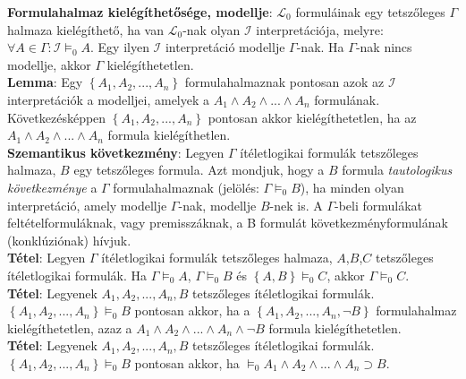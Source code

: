 \documentclass[margin=0px]{article}
\begin{document}
	\noindent \textbf{Formulahalmaz kielégíthetősége, modellje}: $\mathcal{L}_{0}$ formuláinak egy tetszőleges $\Gamma$ halmaza
	kielégíthető, ha van $\mathcal{L}_{0}$-nak olyan $\mathcal{I}$ interpretációja, melyre: $\forall A \in \Gamma: \mathcal{I} \models_{0} A$.
	Egy ilyen $\mathcal{I}$ interpretáció modellje $\Gamma$-nak. Ha $\Gamma$-nak nincs modellje, akkor $\Gamma$ kielégíthetetlen.\\
	
	\noindent \textbf{Lemma}: Egy $\left\{A_{1},A_{2},...,A_{n}\right\}$ formulahalmaznak pontosan azok az $\mathcal{I}$ interpretációk
	a modelljei, amelyek a $A_{1} \wedge A_{2} \wedge ... \wedge A_{n}$ formulának. Következésképpen $\left\{A_{1},A_{2},...,A_{n}\right\}$
	pontosan akkor kielégíthetetlen, ha az $A_{1} \wedge A_{2} \wedge ... \wedge A_{n}$ formula kielégíthetlen.\\
	
	\noindent \textbf{Szemantikus következmény}: Legyen $\Gamma$ ítéletlogikai formulák tetszőleges halmaza, $B$ egy tetszőleges formula.
	Azt mondjuk, hogy a $B$ formula \textit{tautologikus következménye} a $\Gamma$ formulahalmaznak (jelölés: $\Gamma \models_{0} B$), ha minden olyan interpretáció, amely modellje $\Gamma$-nak, modellje $B$-nek is. A $\Gamma$-beli formulákat feltételformuláknak, vagy premisszáknak,
	a B formulát következményformulának (konklúziónak) hívjuk.\\
	
	\noindent \textbf{Tétel}: Legyen $\Gamma$ ítéletlogikai formulák tetszőleges halmaza, $A$,$B$,$C$ tetszőleges ítéletlogikai formulák.
	Ha $\Gamma \models_{0} A$, $\Gamma \models_{0} B$ és $\left\{A,B\right\} \models_{0} C$, akkor $\Gamma \models_{0} C$.\\
	
	\noindent \textbf{Tétel}: Legyenek $A_{1},A_{2},...,A_{n}, B$ tetszőleges ítéletlogikai formulák.
	$\left\{A_{1},A_{2},...,A_{n}\right\} \models_{0} B$ pontosan akkor, ha a $\left\{A_{1},A_{2},...,A_{n}, \neg B\right\}$
	formulahalmaz kielégíthetetlen, azaz a $A_{1} \wedge A_{2} \wedge ... \wedge A_{n} \wedge \neg B$ formula kielégíthetetlen.\\
	
	\noindent \textbf{Tétel}: Legyenek $A_{1},A_{2},...,A_{n}, B$ tetszőleges ítéletlogikai formulák.
	$\left\{A_{1},A_{2},...,A_{n}\right\} \models_{0} B$ pontosan akkor, ha
	$\models_{0} A_{1} \wedge A_{2} \wedge ... \wedge A_{n} \supset B$.\\
	
\end{document}
